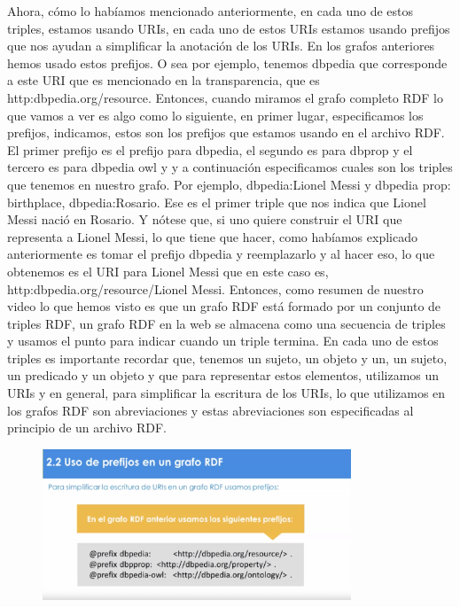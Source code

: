 Ahora, cómo lo habíamos mencionado anteriormente, en cada uno de estos triples, estamos usando URIs, en cada uno de estos URIs estamos usando prefijos que nos ayudan a simplificar la anotación de los URIs. En los grafos anteriores hemos usado estos prefijos. O sea por ejemplo, tenemos dbpedia que corresponde a este URI que es mencionado en la transparencia, que es http:dbpedia.org/resource. Entonces, cuando miramos el grafo completo RDF lo que vamos a ver es algo como lo siguiente, en primer lugar, especificamos los prefijos, indicamos, estos son los prefijos que estamos usando en el archivo RDF. El primer prefijo es el prefijo para dbpedia, el segundo es para dbprop y el tercero es para dbpedia owl y y a continuación especificamos cuales son los triples que tenemos en nuestro grafo. Por ejemplo, dbpedia:Lionel Messi y dbpedia prop: birthplace, dbpedia:Rosario. Ese es el primer triple que nos indica que Lionel Messi nació en Rosario. Y nótese que, si uno quiere construir el URI que representa a Lionel Messi, lo que tiene que hacer, como habíamos explicado anteriormente es tomar el prefijo dbpedia y reemplazarlo y al hacer eso, lo que obtenemos es el URI para Lionel Messi que en este caso es, http:dbpedia.org/resource/Lionel Messi. Entonces, como resumen de nuestro video lo que hemos visto es que un grafo RDF está formado por un conjunto de triples RDF, un grafo RDF en la web se almacena como una secuencia de triples y usamos el punto para indicar cuando un triple termina. En cada uno de estos triples es importante recordar que, tenemos un sujeto, un objeto y un, un sujeto, un predicado y un objeto y que para representar estos elementos, utilizamos un URIs y en general, para simplificar la escritura de los URIs, lo que utilizamos en los grafos RDF son abreviaciones y estas abreviaciones son especificadas al principio de un archivo RDF. 

\begin{figure}[H]
	\centering
	\includegraphics[height=4.5cm]{imagenes/capitulo3/19} 
	\caption{}
	\label{}
\end{figure}

